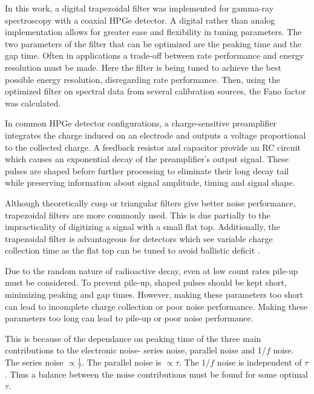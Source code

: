 In this work, a digital trapezoidal filter was implemented for gamma-ray spectroscopy with a coaxial HPGe detector. A digital rather than analog implementation allows for greater ease and flexibility in tuning parameters. The two parameters of the filter that can be optimized are the peaking time and the gap time. Often in applications a trade-off between rate performance and energy resolution must be made.  Here the filter is being tuned to achieve the best possible energy resolution, disregarding rate performance. Then, using the optimized filter on spectral data from several calibration sources, the Fano factor was calculated.

In common HPGe detector configurations, a charge-sensitive preamplifier integrates the charge induced on an electrode and outputs a voltage proportional to the collected charge. A feedback resistor and capacitor provide an RC circuit which causes an exponential decay of the preamplifier's output signal. These pulses are shaped before further processing to eliminate their long decay tail while preserving information about signal amplitude, timing and signal shape.

Although theoretically cusp or triangular filters give better noise performance, trapezoidal filters are more commonly used. This is due partially to the impracticality of digitizing a signal with a small flat top. Additionally, the trapezoidal filter is advantageous for detectors which see variable charge collection time as the flat top can be tuned to avoid ballistic deficit \cite{Knoll}.

Due to the random nature of radioactive decay, even at low count rates pile-up must be considered. To prevent pile-up, shaped pulses should be kept short, minimizing peaking and gap times. However, making these parameters too short can lead to incomplete charge collection or poor noise performance. Making these parameters too long can lead to pile-up or poor noise performance.

This is because of the dependance on peaking time of the three main contributions to the electronic noise- series noise, parallel noise and 1/$f$ noise. The series noise $\propto \frac{1}{\tau}$. The parallel noise is $\propto\tau$. The 1/$f$ noise is independent of $\tau$. Thus a balance between the noise contributions must be found for some optimal $\tau$. 

